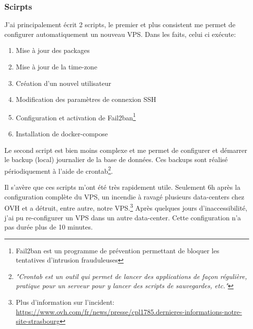 \subsubsection{Scirpts}
\label{scritps}
J'ai principalement écrit 2 scripts, le premier et plus consistent me permet de configurer automatiquement un nouveau VPS. Dans les faits, celui ci exécute: 
\begin{enumerate}
  \item Mise à jour des packages
  \item Mise à jour de la time-zone
  \item Création d'un nouvel utilisateur
  \item Modification des paramètres de connexion SSH
  \item Configuration et activation de Fail2ban\footnote{Fail2ban est un programme de prévention permettant de bloquer les tentatives d'intrusion frauduleuses}
  \item Installation de docker-compose
\end{enumerate}

\newpara

Le second script est bien moins complexe et me permet de configurer et démarrer le backup (local) journalier de la base de données. Ces backups sont réalisé périodiquement à l'aide de crontab\footnote{\textit{"Crontab est un outil qui permet de lancer des applications de façon régulière, pratique pour un serveur pour y lancer des scripts de sauvegardes, etc."}\cite{CRON}}.

\newpara

Il s'avère que ces scripts m'ont été très rapidement utile. Seulement 6h après la configuration complète du VPS, un incendie à ravagé plusieurs data-centers chez OVH et a détruit, entre autre, notre VPS.\footnote{Plus d'information sur l'incident: \url{https://www.ovh.com/fr/news/presse/cpl1785.dernieres-informations-notre-site-strasbourg}} Après quelques jours d'inaccessibilité, j'ai pu re-configurer un VPS dans un autre data-center. Cette configuration n'a pas durée plus de 10 minutes.

\newpage

